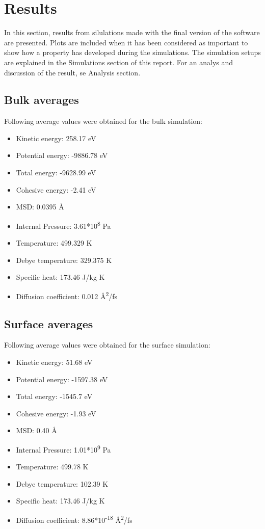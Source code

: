 \section{Results}
In this section, results from silulations made with the final version of the software are presented. Plots are included when it has been considered as important to show how a property has developed during the simulations. The simulation setups are explained in the Simulations section of this report. For an analys and discussion of the result, se Analysis section.
\subsection{Bulk averages}

Following average values were obtained for the bulk simulation:
\begin{itemize}
	\item Kinetic energy: 258.17 eV
	\item Potential energy: -9886.78 eV
	\item Total energy: -9628.99 eV
	\item Cohesive energy: -2.41 eV
	\item MSD: 0.0395 Å
	\item Internal Pressure: 3.61*10\textsuperscript{8} Pa
	\item Temperature: 499.329 K
	\item Debye temperature: 329.375 K
	\item Specific heat: 173.46 J/kg K
	\item Diffusion coefficient: 0.012 Å\textsuperscript{2}/fs
\end{itemize}

\subsection{Surface averages}
Following average values were obtained for the surface simulation:
\begin{itemize}
	\item Kinetic energy: 51.68 eV
	\item Potential energy: -1597.38 eV
	\item Total energy: -1545.7 eV
	\item Cohesive energy: -1.93 eV
	\item MSD: 0.40 Å
	\item Internal Pressure: 1.01*10\textsuperscript{9} Pa
	\item Temperature: 499.78 K
	\item Debye temperature: 102.39 K
	\item Specific heat: 173.46 J/kg K
	\item Diffusion coefficient: 8.86*10\textsuperscript{-18} Å\textsuperscript{2}/fs
\end{itemize}

